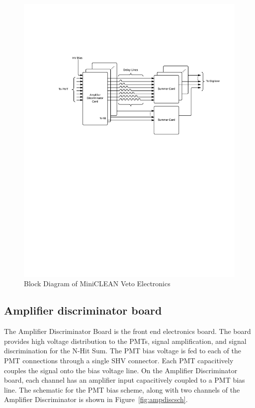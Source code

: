 \documentclass{JINST}
\begin{document}
\begin{figure}[ht]
\begin{center}
\includegraphics[width=5in, keepaspectratio=true, trim=1.25in 5.75in 0.5in 2in, clip=true]{graphics/block}
\caption{Block Diagram of MiniCLEAN Veto Electronics
\label{fig:block_diagram}}
\end{center}
\end{figure}

\subsection{Amplifier discriminator board}
\label{sec:Amp-Disc}
%
The Amplifier Discriminator Board is the front end electronics board.
The board provides high voltage distribution to the PMTs, signal
amplification, and signal discrimination for the N-Hit Sum.  The PMT
bias voltage is fed to each of the PMT connections through a single
SHV connector.  Each PMT capacitively couples the signal onto the bias
voltage line.  On the Amplifier Discriminator board, each channel has
an amplifier input capacitively coupled to a PMT bias line.  The schematic for the
PMT bias scheme, along with two channels of the Amplifier Discriminator is shown in Figure~\ref{fig:ampdiscsch}.
\end{document}
